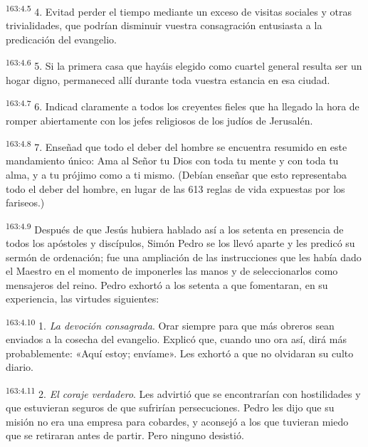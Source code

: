 \par 
\textsuperscript{163:4.5} 4. Evitad perder el tiempo mediante un exceso de visitas sociales y otras trivialidades, que podrían disminuir vuestra consagración entusiasta a la predicación del evangelio.

\par 
\textsuperscript{163:4.6} 5. Si la primera casa que hayáis elegido como cuartel general resulta ser un hogar digno, permaneced allí durante toda vuestra estancia en esa ciudad.

\par 
\textsuperscript{163:4.7} 6. Indicad claramente a todos los creyentes fieles que ha llegado la hora de romper abiertamente con los jefes religiosos de los judíos de Jerusalén.

\par 
\textsuperscript{163:4.8} 7. Enseñad que todo el deber del hombre se encuentra resumido en este mandamiento único: Ama al Señor tu Dios con toda tu mente y con toda tu alma, y a tu prójimo como a ti mismo. (Debían enseñar que esto representaba todo el deber del hombre, en lugar de las 613 reglas de vida expuestas por los fariseos.)

\par 
\textsuperscript{163:4.9} Después de que Jesús hubiera hablado así a los setenta en presencia de todos los apóstoles y discípulos, Simón Pedro se los llevó aparte y les predicó su sermón de ordenación; fue una ampliación de las instrucciones que les había dado el Maestro en el momento de imponerles las manos y de seleccionarlos como mensajeros del reino. Pedro exhortó a los setenta a que fomentaran, en su experiencia, las virtudes siguientes:

\par 
\textsuperscript{163:4.10} 1. \textit{La devoción consagrada}. Orar siempre para que más obreros sean enviados a la cosecha del evangelio. Explicó que, cuando uno ora así, dirá más probablemente: «Aquí estoy; envíame». Les exhortó a que no olvidaran su culto diario.

\par 
\textsuperscript{163:4.11} 2. \textit{El coraje verdadero}. Les advirtió que se encontrarían con hostilidades y que estuvieran seguros de que sufrirían persecuciones. Pedro les dijo que su misión no era una empresa para cobardes, y aconsejó a los que tuvieran miedo que se retiraran antes de partir. Pero ninguno desistió.

